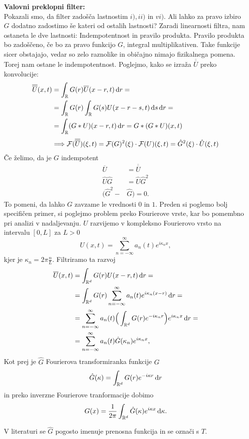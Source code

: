 \documentclass[mat2, tisk]{fmfdelo}
\newcommand{\R}{\mathbb R}
\begin{document}
\noindent
\textbf{Valovni preklopni filter:} \\
Pokazali smo, da filter zadošča lastnostim $i), ii)$ in $vi)$. Ali lahko za pravo izbiro 
$G$ dodatno zadostimo še kateri od ostalih lastnosti? Zaradi linearnosti filtra, nam 
ostaneta le dve lastnosti: Indempotentnost in pravilo produkta. Pravilo produkta bo
zadoščeno, če bo za pravo funkcijo $G$, integral multiplikativen. Take funkcije sicer 
obstajajo, vedar so zelo raznolike in običajno nimajo fizikalnega pomena. Torej nam ostane 
le indempotentnost. Poglejmo, kako se izraža $\overline{\overline{U}}$ preko konvolucije:
\begin{align*}
\overline{\overline{U}}(x, t) &= \int_{\R} G(r) \overline{U}(x - r, t) \dif r = \\
&= \int_{\R} G(r) \int_{\R} G(s) U(x-r-s, t) \dif s \dif r = \\
&= \int_{\R} (G*U)(x - r, t) \dif r = G*(G * U)(x, t) \\[1mm]
&\Longrightarrow \mathcal{F}(\overline{\overline{U}})(\xi, t) = \mathcal{F}(G)^2(\xi)\cdot\mathcal{F}(U)(\xi, t) = \hat{G}^2(\xi) \cdot \hat{U}(\xi, t)
\end{align*}
Če želimo, da je $G$ indempotent
\begin{align*}
\overline{U} &= \overline{\overline{U}} \\
\hat{U}\hat{G} &= \hat{U}\hat{G}^2 \\ 
(\hat{G}^2 - &\hat{G}) = 0.
\end{align*}
To pomeni, da lahko $G$ zavzame le vrednosti $0$ in $1$. Preden si poglemo bolj specifičen primer, 
si poglejmo problem preko Fourierove vrste, kar bo pomembno pri analizi v nadaljevanju.
$U$ razvijemo v kompleksno Fourierovo vrsto na intervalu $[0, L]$ za $L > 0$
\begin{equation}
U(x, t) = \sum_{n=-\infty}^\infty a_n(t) e^{i\kappa_n x},
\end{equation}
kjer je $\kappa_n = 2\pi\frac{n}{L}$. Filtriramo ta razvoj 
\begin{align*}
\overline{U}(x, t) &= \int_{\R^d} G(r) U(x - r, t) \dif r = \\
&= \int_{\R^d} G(r) \sum_{n=-\infty}^\infty a_n(t) e^{i\kappa_n (x - r)} \dif r = \\
&= \sum_{n=-\infty}^\infty a_n(t)\Big(\int_{\R^d} G(r) e^{-i\kappa_n r}\Big) e^{i\kappa_n x}\dif r = \\
&= \sum_{n=-\infty}^\infty a_n(t) \hat{G}(\kappa_n) e^{i\kappa_n x},
\end{align*}
Kot prej je $\hat{G}$ Fourierova transformiranka funkcije $G$ 
$$
\hat{G}(\kappa) = \int_{\R^d} G(r) e^{-i\kappa r} \dif r
$$
in preko inverzne Fourierove tranformacije dobimo
$$
G(x) = \frac{1}{2\pi} \int_{\R^d} \hat{G}(\kappa) e^{i\kappa x} \dif \kappa.
$$
\begin{opomba}
V literaturi se $\hat{G}$ pogosto imenuje prenosna funkcija in se označi s $T$.
\end{opomba}
\end{document}

